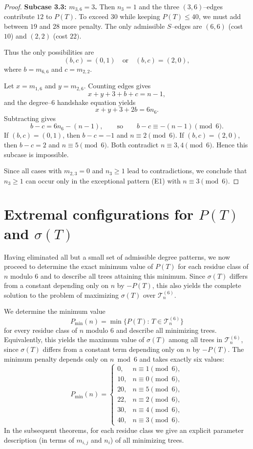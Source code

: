 \documentclass[preprint,12pt]{elsarticle}
\begin{document}
\begin{proof}
\smallskip
\noindent
\textbf{Subcase 3.3: $m_{3,6}=3$.}
Then $n_3=1$ and the three $(3,6)$–edges contribute $12$ to $P(T)$.
To exceed $30$ while keeping $P(T)\le 40$, we must add between $19$ and $28$ more penalty.
The only admissible $S$–edges are $(6,6)$ (cost $10$) and $(2,2)$ (cost $22)$.

Thus the only possibilities are
\[
(b,c)=(0,1)\quad\text{or}\quad(b,c)=(2,0),
\]
where $b=m_{6,6}$ and $c=m_{2,2}$.

Let $x=m_{1,6}$ and $y=m_{2,6}$.
Counting edges gives
\[
x+y+3+b+c=n-1,
\]
and the degree–$6$ handshake equation yields
\[
x+y+3+2b=6n_6.
\]
Subtracting gives
\[
b-c=6n_6-(n-1),
\qquad\text{so}\qquad
b-c\equiv -(n-1)\pmod 6.
\]
If $(b,c)=(0,1)$, then $b-c=-1$ and $n\equiv 2\pmod 6$.
If $(b,c)=(2,0)$, then $b-c=2$ and $n\equiv 5\pmod 6$.
Both contradict $n\equiv 3,4\pmod 6$.
Hence this subcase is impossible.

\medskip
\noindent
Since all cases with $m_{2,3}=0$ and $n_3\ge 1$ lead to contradictions,
we conclude that $n_3\ge 1$ can occur only in the exceptional pattern \textup{(E1)}
with $n\equiv 3\pmod 6$.
\end{proof}


\section{Extremal configurations for $P(T)$ and $\sigma(T)$}
\label{sec:extremal}

Having eliminated all but a small set of admissible degree patterns, we now proceed
to determine the exact minimum value of $P(T)$ for each residue class of $n$ modulo $6$
and to describe all trees attaining this minimum. Since $\sigma(T)$ differs from a
constant depending only on $n$ by $-P(T)$, this also yields the complete solution to
the problem of maximizing $\sigma(T)$ over $\mathcal{T}_n^{(6)}$.



\bigskip

We determine the minimum value
\[
P_{\min}(n)=\min\{P(T):\,T\in\mathcal{T}_n^{(6)}\}
\]
for every residue class of $n$ modulo $6$ and describe all minimizing trees.
Equivalently, this yields the maximum value of $\sigma(T)$ among all trees in
$\mathcal{T}_n^{(6)}$, since $\sigma(T)$ differs from a constant term depending only on $n$
by $-P(T)$.
The minimum penalty depends only on $n \bmod 6$ and takes exactly six values:
\[
P_{\min}(n)=
\begin{cases}
0,  & n\equiv 1 \pmod 6,\\
10, & n\equiv 0 \pmod 6,\\
20, & n\equiv 5 \pmod 6,\\
22, & n\equiv 2 \pmod 6,\\
30, & n\equiv 4 \pmod 6,\\
40, & n\equiv 3 \pmod 6.
\end{cases}
\]
In the subsequent theorems, for each residue class we give an explicit parameter
description (in terms of $m_{i,j}$ and $n_i$) of all minimizing trees.
\end{document}
